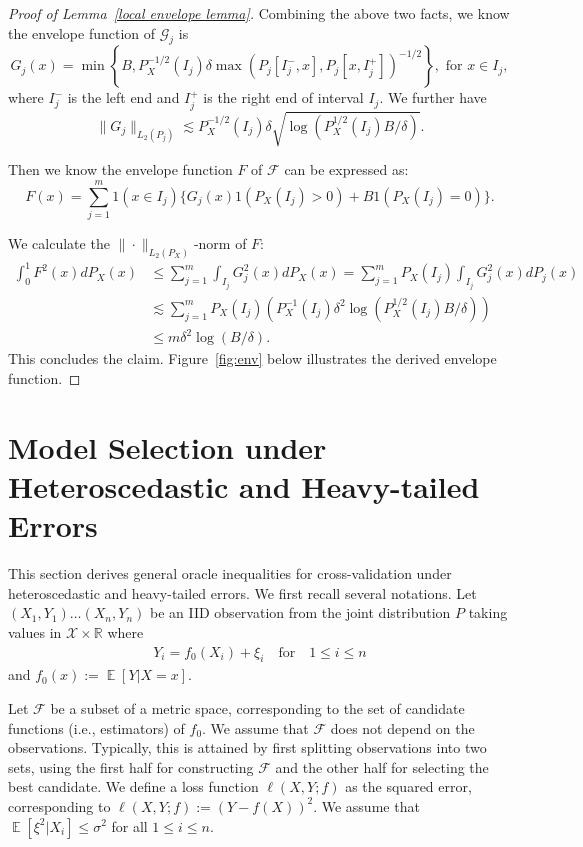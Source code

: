 \documentclass[12pt]{article}
\DeclareMathOperator*{\E}{\mathbb{E}}
\begin{document}
\begin{appendices}
\begin{proof}[Proof of Lemma~\ref{local envelope lemma}]
Combining the above two facts, we know the envelope function of $\mathcal{G}_j$ is
\begin{equation}
G_j(x)=\min \left\{B, P_X^{-1/2}(I_j)\delta \max \left(P_j[I^-_j, x], P_j[x, I^+_{j}]\right)^{-1 / 2}\right\},\text{ for } x\in I_j,\nonumber
\end{equation}
where $I^-_j$ is the left end and $I^+_j$ is the right end of interval $I_j$. We further have 
$$\|G_j\|_{L_2(P_j)} \lesssim P_X^{-1/2}(I_j)\delta\sqrt{\log(P_X^{1/2}(I_j)B/\delta)}.$$

Then we know the envelope function $F$ of $\mathcal{F}$ can be expressed as:
\begin{equation}
    F(x) = \sum_{j=1}^m 1(x\in I_j)\{G_j(x)1(P_X(I_j) > 0) + B1(P_X(I_j) = 0)\}.\nonumber
\end{equation}

We calculate the $\|\cdot\|_{L_2(P_X)}$-norm of $F$:
\begin{equation}\nonumber
\begin{aligned}
    \int_0^1 F^2(x) dP_X(x) 
    &\leq \sum_{j=1}^m \int_{I_j} G_j^2(x) dP_X(x) = \sum_{j=1}^m P_X(I_j)\int_{I_j} G_j^2(x) dP_j(x)\\
    & \lesssim \sum_{j=1}^m P_X(I_j) \left( P_X^{-1}(I_j) \delta^2 \log(P_X^{1/2}(I_j)B/\delta)\right)\\
    &\leq m\delta^2\log(B/\delta).
\end{aligned} 
\end{equation}
This concludes the claim. Figure~\ref{fig:env} below illustrates the derived envelope function. 
\end{proof}




\newpage
\section{Model Selection under Heteroscedastic and Heavy-tailed Errors}
This section derives general oracle inequalities for cross-validation under heteroscedastic and heavy-tailed errors. We first recall several notations. Let $(X_1, Y_1) \ldots (X_n, Y_n)$ be an IID observation from the joint distribution $P$ taking values in $\mathcal{X}\times\mathbb{R}$ where 
\begin{align}
	Y_i = f_0(X_i) + \xi_i \quad \textrm{for}\quad 1\le i \le n
\end{align} 
and $f_0(x) := \E[Y|X=x]$.

Let $\mathcal{F}$ be a subset of a metric space, corresponding to the set of candidate functions (i.e., estimators) of $f_0$. We assume that $\mathcal{F}$ does not depend on the observations. Typically, this is attained by first splitting observations into two sets, using the first half for constructing $\mathcal{F}$ and the other half for selecting the best candidate. We define a loss function $\ell(X,Y; f)$ as the squared error, corresponding to $\ell(X,Y; f):= (Y - f(X))^2$. We assume that $\E[\xi^2|X_i] \le \sigma^2$ for all $1\le i \le n$. 


\end{appendices}
\end{document}
